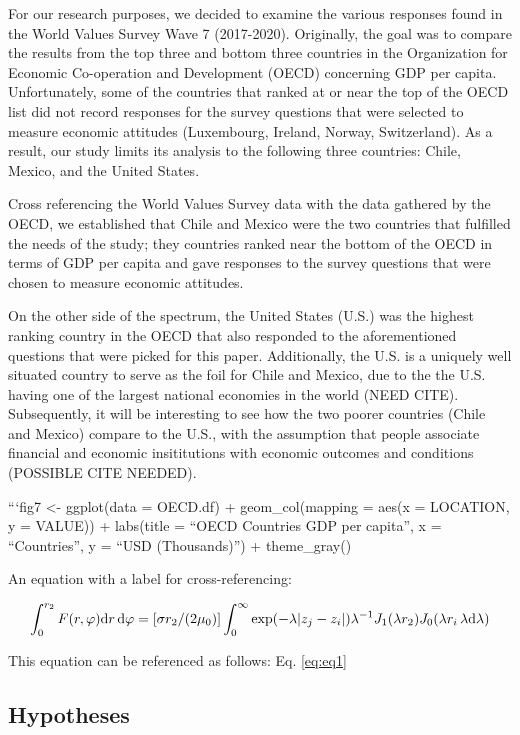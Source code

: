 \documentclass[12pt,halfline,a4paper,]{ouparticle}
\begin{document}
For our research purposes, we decided to examine the various responses
found in the World Values Survey Wave 7 (2017-2020). Originally, the
goal was to compare the results from the top three and bottom three
countries in the Organization for Economic Co-operation and Development
(OECD) concerning GDP per capita. Unfortunately, some of the countries
that ranked at or near the top of the OECD list did not record responses
for the survey questions that were selected to measure economic
attitudes (Luxembourg, Ireland, Norway, Switzerland). As a result, our
study limits its analysis to the following three countries: Chile,
Mexico, and the United States.

Cross referencing the World Values Survey data with the data gathered by
the OECD, we established that Chile and Mexico were the two countries
that fulfilled the needs of the study; they countries ranked near the
bottom of the OECD in terms of GDP per capita and gave responses to the
survey questions that were chosen to measure economic attitudes.

On the other side of the spectrum, the United States (U.S.) was the
highest ranking country in the OECD that also responded to the
aforementioned questions that were picked for this paper. Additionally,
the U.S. is a uniquely well situated country to serve as the foil for
Chile and Mexico, due to the the U.S. having one of the largest national
economies in the world (NEED CITE). Subsequently, it will be interesting
to see how the two poorer countries (Chile and Mexico) compare to the
U.S., with the assumption that people associate financial and economic
insititutions with economic outcomes and conditions (POSSIBLE CITE
NEEDED).

```fig7 \textless- ggplot(data = OECD.df) + geom\_col(mapping = aes(x =
LOCATION, y = VALUE)) + labs(title = ``OECD Countries GDP per capita'',
x = ``Countries'', y = ``USD (Thousands)'') + theme\_gray()

An equation with a label for cross-referencing:

\begin{equation}\label{eq:eq1}
\int^{r_2}_0 F(r,\varphi){\rm d}r\,{\rm d}\varphi = [\sigma r_2/(2\mu_0)]
\int^{\infty}_0\exp(-\lambda|z_j-z_i|)\lambda^{-1}J_1 (\lambda r_2)J_0
(\lambda r_i\,\lambda {\rm d}\lambda)
\end{equation}

This equation can be referenced as follows: Eq. \ref{eq:eq1}

\hypertarget{hypotheses}{%
\subsection{Hypotheses}\label{hypotheses}}
\end{document}
